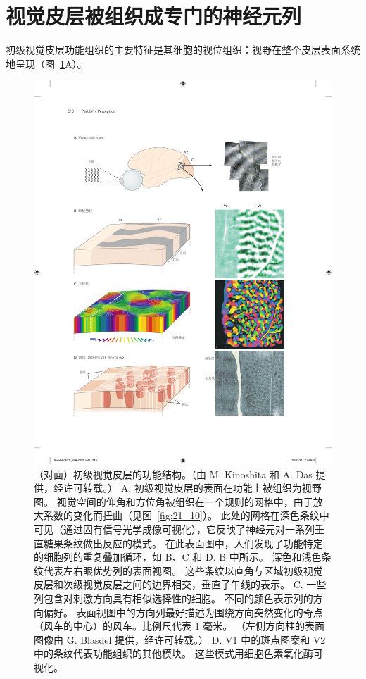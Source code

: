 \section{视觉皮层被组织成专门的神经元列}

初级视觉皮层功能组织的主要特征是其细胞的视位组织：视野在整个皮层表面系统地呈现（图~\ref{fig:21_11}A）。


\begin{figure}[htbp]
	\centering
	\includegraphics[width=1.0\linewidth]{chap21/fig_21_11}
	\caption{（对面）初级视觉皮层的功能结构。（由 M. Kinoshita 和 A. Das 提供，经许可转载。） 
		A. 初级视觉皮层的表面在功能上被组织为视野图。 
		视觉空间的仰角和方位角被组织在一个规则的网格中，由于放大系数的变化而扭曲（见图~\ref{fig:21_10}）。
		此处的网格在深色条纹中可见（通过固有信号光学成像可视化），它反映了神经元对一系列垂直糖果条纹做出反应的模式。
		在此表面图中，人们发现了功能特定的细胞列的重复叠加循环，如 B、C 和 D. B 中所示。
		深色和浅色条纹代表左右眼优势列的表面视图。
		这些条纹以直角与区域初级视觉皮层和次级视觉皮层之间的边界相交，垂直子午线的表示。
		C. 一些列包含对刺激方向具有相似选择性的细胞。 
		不同的颜色表示列的方向偏好。
		表面视图中的方向列最好描述为围绕方向突然变化的奇点（风车的中心）的风车。比例尺代表 1 毫米。 （左侧方向柱的表面图像由 G. Blasdel 提供，经许可转载。）
		D. V1 中的斑点图案和 V2 中的条纹代表功能组织的其他模块。
		这些模式用细胞色素氧化酶可视化。}
	\label{fig:21_11}
\end{figure}


